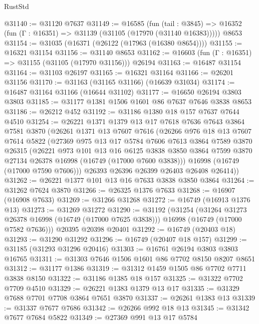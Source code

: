 \begin{lexlean}{RustStd}
\begin{coremodule}
@31140 := @31120 @7637
@31149 := @16585
    (fun (tail : @3845) => @16352 (fun (Γ : @16351) => @31139 (@31105 (@17970 (@31140 @16383)))))
    @8653
@31154 := @31035 (@16371 (@26122 (@17963 (@16380 @8654))))
@31155 := @16321 @31154
@31156 := @31140 @8653
@31162 := @16603 (fun (Γ : @16351) => @31155 (@31105 (@17970 @31156))) @26194
@31163 := @16487 @31154
@31164 := @31103 @26197
@31165 := @16321 @31164
@31166 := @26201 @31156
@31170 := @31163 (@31165 @31166) (@16639 @31034)
@31174 := @16487 @31164 @31166 (@16644 @31102)
@31177 := @16650 @26194 @3803 @3803
@31185 := @31177 @1381 @1506 @1601 @86 @7637 @7646 @3838 @8653
@31186 := @26212 @452
@31192 := @31186 @1380 @18 @157 @7637 @7644 @4510
@31254 := @26221
    @1371
    @1379
    @13
    @17
    @7618
    @7636
    @7643
    @3864
    @7581
    @3870
    (@26261
      @1371
      @13
      @7607
      @7616
      (@26266
        @976
        @18
        @13
        @7607
        @7614
        @5822
        (@27369
          @975
          @13
          @17
          @5784
          @7606
          @7613
          @3864
          @7589
          @3870
          @26315
          (@26221
            @973
            @101
            @13
            @16
            @6125
            @3838
            @3850
            @3864
            @7599
            @3870
            @27134
            @26378
            @16998
            (@16749 (@17000 @7600 @3838)))
          @16998
          (@16749 (@17000 @7590 @7606)))
        @26393
        @26396
        @26399
        @26403
        @26408
        @26414))
@31262 := @26221 @1377 @101 @13 @16 @7633 @3838 @3850 @3864
@31264 := @31262 @7624 @3870
@31266 := @26325 @1376 @7633
@31268 := @16907 (@16908 @7633)
@31269 := @31266 @31268
@31272 := @16749 (@16913 @1376 @13)
@31273 := @31269 @31272
@31290 := @31192
    (@31254
      (@31264 @31273 @26378 @16998 (@16749 (@17000 @7625 @3838)))
      @16998
      (@16749 (@17000 @7582 @7636)))
    @20395
    @20398
    @20401
@31292 := @16749 (@20403 @18)
@31293 := @31290 @31292
@31296 := @16749 (@20407 @18 @157)
@31299 := @31185 (@31293 @31296 @20416)
@31303 := @16761 @26194 @3803 @3803 @16765
@31311 := @31303 @7646 @1506 @1601 @86 @7702 @8150 @8207 @8651
@31312 := @31177 @1386
@31319 := @31312 @1459 @1505 @86 @7702 @7711 @3838 @8150
@31322 := @31186 @1385 @18 @157
@31325 := @31322 @7702 @7709 @4510
@31329 := @26221 @1383 @1379 @13 @17
@31335 := @31329 @7688 @7701 @7708 @3864 @7651 @3870
@31337 := @26261 @1383 @13
@31339 := @31337 @7677 @7686
@31342 := @26266 @992 @18 @13
@31345 := @31342 @7677 @7684 @5822
@31349 := @27369 @991 @13 @17 @5784

\end{coremodule}
\end{lexlean}
